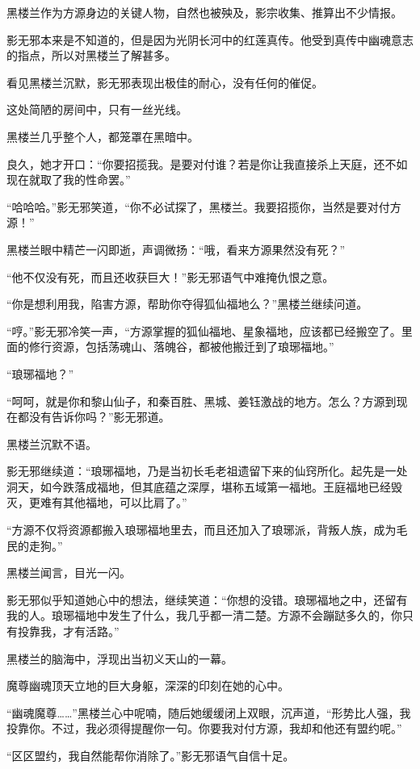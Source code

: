 \begin{this_body}
黑楼兰作为方源身边的关键人物，自然也被殃及，影宗收集、推算出不少情报。

影无邪本来是不知道的，但是因为光阴长河中的红莲真传。他受到真传中幽魂意志的指点，所以对黑楼兰了解甚多。

看见黑楼兰沉默，影无邪表现出极佳的耐心，没有任何的催促。

这处简陋的房间中，只有一丝光线。

黑楼兰几乎整个人，都笼罩在黑暗中。

良久，她才开口：“你要招揽我。是要对付谁？若是你让我直接杀上天庭，还不如现在就取了我的性命罢。”

“哈哈哈。”影无邪笑道，“你不必试探了，黑楼兰。我要招揽你，当然是要对付方源！”

黑楼兰眼中精芒一闪即逝，声调微扬：“哦，看来方源果然没有死？”

“他不仅没有死，而且还收获巨大！”影无邪语气中难掩仇恨之意。

“你是想利用我，陷害方源，帮助你夺得狐仙福地么？”黑楼兰继续问道。

“哼。”影无邪冷笑一声，“方源掌握的狐仙福地、星象福地，应该都已经搬空了。里面的修行资源，包括荡魂山、落魄谷，都被他搬迁到了琅琊福地。”

“琅琊福地？”

“呵呵，就是你和黎山仙子，和秦百胜、黑城、姜钰激战的地方。怎么？方源到现在都没有告诉你吗？”影无邪道。

黑楼兰沉默不语。

影无邪继续道：“琅琊福地，乃是当初长毛老祖遗留下来的仙窍所化。起先是一处洞天，如今跌落成福地，但其底蕴之深厚，堪称五域第一福地。王庭福地已经毁灭，更难有其他福地，可以比肩了。”

“方源不仅将资源都搬入琅琊福地里去，而且还加入了琅琊派，背叛人族，成为毛民的走狗。”

黑楼兰闻言，目光一闪。

影无邪似乎知道她心中的想法，继续笑道：“你想的没错。琅琊福地之中，还留有我的人。琅琊福地中发生了什么，我几乎都一清二楚。方源不会蹦跶多久的，你只有投靠我，才有活路。”

黑楼兰的脑海中，浮现出当初义天山的一幕。

魔尊幽魂顶天立地的巨大身躯，深深的印刻在她的心中。

“幽魂魔尊……”黑楼兰心中呢喃，随后她缓缓闭上双眼，沉声道，“形势比人强，我投靠你。不过，我必须得提醒你一句。你要我对付方源，我却和他还有盟约呢。”

“区区盟约，我自然能帮你消除了。”影无邪语气自信十足。


\end{this_body}
